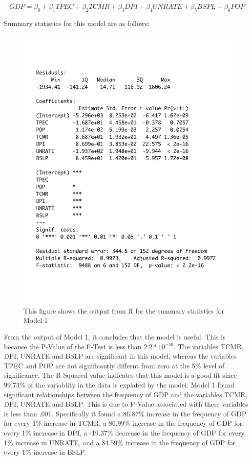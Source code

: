 \documentclass[12pt]{article}
\begin{document}
\begin{equation}
  GDP = \beta_0 + \beta_1 TPEC + \beta_2 TCMR+ \beta_3 DPI + \beta_4 UNRATE + \beta_5 BSPL +\beta_6 POP
\end{equation}

Summary statistics for this model are as follows:

\begin{figure}[H]
  \centering
  \includegraphics[scale = .5]{mod1output}
  \caption{This figure shows the output from R for the summary statistics for Model 1}
\end{figure}


From the output of Model 1, it concludes that the model is useful.
This is because the P-Value of the F-Test is less than $2.2 * 10^{-16}$.
The variables TCMR, DPI, UNRATE and BSLP are significant in this model, whereas the variables TPEC and POP are not significantly differnt from zero at the 5\% level of significance.  
The R-Squared value indicates that this model is a good fit since 99.73\% of the variablity in the data is explated by the model. 
Model 1 found significant relationships between the frequency of GDP and the variables TCMR, DPI, UNRATE and BSLP. 
This is due to P-Value associated with these variables is less than .001. 
Specifically it found a 86.87\% increase in the frequency of GDP for every 1\% increase in TCMR, a 86.99\% increase in the frequency of GDP for every 1\% increase in DPI, a -19.37\% decrease in the frequency of GDP for every 1\% increase in UNRATE, and a 84.59\% increase in the frequency of GDP for every 1\% increase in BSLP.
\end{document}
